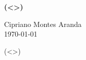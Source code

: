 \documentclass{article}
\begin{document}
\begin{center}
	\LARGE \textbf{(<>)}
\end{center}

		\small
		\begin{flushright}
			Cipriano Montes Aranda\\
			\today
		\end{flushright}
		

		\vspace{0.6cm}


(<>)

\end{document}
